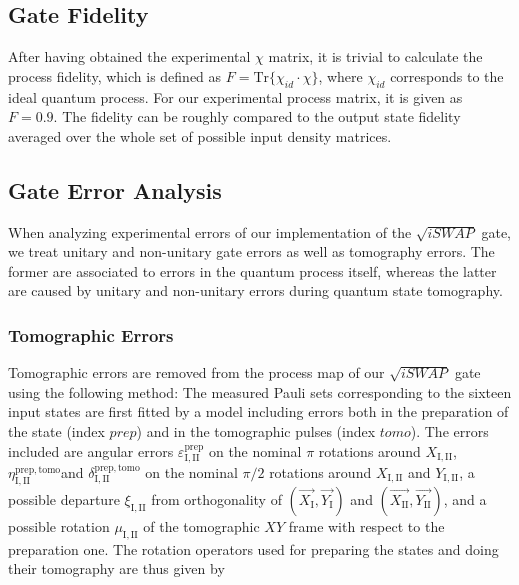 \subsection{Gate Fidelity}

After having obtained the experimental $\chi$ matrix, it is trivial to calculate the process fidelity, which is defined as $F=\mathrm{Tr}\{\chi_{id}\cdot\chi\}$, where $\chi_{id}$ corresponds to the ideal quantum process. For our experimental process matrix, it is given as $F=0.9$. The fidelity can be roughly compared to the output state fidelity averaged over the whole set of possible input density matrices.

\subsection{Gate Error Analysis}

When analyzing experimental errors of our implementation of the $\sqrt{iSWAP}$ gate, we treat unitary and non-unitary gate errors as well as tomography errors. The former are associated to errors in the quantum process itself, whereas the latter are caused by unitary and non-unitary errors during quantum state tomography.

\smallskip

\subsubsection{Tomographic Errors} \label{section:tomographic_errors}

Tomographic errors are removed from the process map of our $\sqrt{iSWAP}$
gate using the following method: The measured Pauli sets corresponding
to the sixteen input states are first fitted by a model including
errors both in the preparation of the state (index $prep$) and in
the tomographic pulses (index $tomo$). The errors included are angular
errors $\varepsilon_{\mathrm{I,II}}^{\mathrm{prep}}$ on the nominal
$\pi$ rotations around $X_{\mathrm{I,II}}$, $\eta_{\mathrm{I,II}}^{\mathrm{prep,tomo}}$and
$\delta_{\mathrm{I,II}}^{\mathrm{prep,tomo}}$ on the nominal $\pi/2$
rotations around $X_{\mathrm{I,II}}$ and $Y_{\mathrm{I,II}}$, a
possible departure $\xi_{\mathrm{I,II}}$ from orthogonality of $\left(\overrightarrow{X_{\mathrm{I}}},\overrightarrow{Y_{\mathrm{I}}}\right)$
and $\left(\overrightarrow{X_{\mathrm{II}}},\overrightarrow{Y_{\mathrm{II}}}\right)$,
and a possible rotation $\mu_{\mathrm{I,II}}$ of the tomographic
$XY$ frame with respect to the preparation one. The rotation operators
used for preparing the states and doing their tomography are thus
given by

